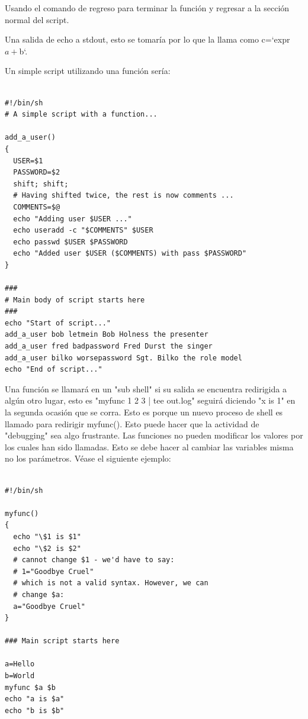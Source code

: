 \documentclass{article} %
\begin{document}
\vspace{0.5 cm}

Usando el comando de regreso para terminar la función y regresar a la sección normal del script.

\vspace{0.5 cm}

Una salida de echo a stdout, esto se tomaría por lo que la llama como c=`expr $a + $b`.

\vspace{0.5 cm}

Un simple script utilizando una función sería:

\begin{verbatim} 

#!/bin/sh
# A simple script with a function...

add_a_user()
{
  USER=$1
  PASSWORD=$2
  shift; shift;
  # Having shifted twice, the rest is now comments ...
  COMMENTS=$@
  echo "Adding user $USER ..."
  echo useradd -c "$COMMENTS" $USER
  echo passwd $USER $PASSWORD
  echo "Added user $USER ($COMMENTS) with pass $PASSWORD"
}

###
# Main body of script starts here
###
echo "Start of script..."
add_a_user bob letmein Bob Holness the presenter
add_a_user fred badpassword Fred Durst the singer
add_a_user bilko worsepassword Sgt. Bilko the role model
echo "End of script..."

\end{verbatim}

Una función se llamará en un "sub shell" si su salida se encuentra redirigida a algún otro lugar, esto es "myfunc 1 2 3 | tee out.log" seguirá diciendo "x is 1" en la segunda ocasión que se corra. Esto es porque un nuevo proceso de shell es llamado para redirigir myfunc(). Esto puede hacer que la actividad de "debugging" sea algo frustrante. Las funciones no pueden modificar los valores por los cuales han sido llamadas. Esto se debe hacer al cambiar las variables misma no los parámetros. Véase el siguiente ejemplo:

\begin{verbatim} 

#!/bin/sh

myfunc()
{
  echo "\$1 is $1"
  echo "\$2 is $2"
  # cannot change $1 - we'd have to say:
  # 1="Goodbye Cruel"
  # which is not a valid syntax. However, we can
  # change $a:
  a="Goodbye Cruel"
}

### Main script starts here 

a=Hello
b=World
myfunc $a $b
echo "a is $a"
echo "b is $b"

\end{verbatim}
\end{document}
